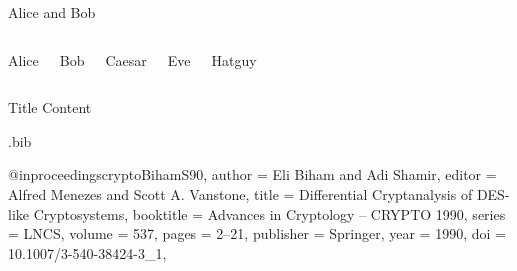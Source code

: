 \documentclass[biblatex]{cryptolecture}
\begin{document}
\begin{frame}{Alice and Bob}
  \begin{columns}[onlytextwidth,T]
      \begin{block}{Alice}\centering
        \alice[1.5cm]
      \end{block}

      \begin{block}{Bob}\centering
        \bob[1.5cm]
      \end{block}

      \begin{block}{Caesar}\centering
        \caesar[1.5cm]
      \end{block}

      \begin{block}{Eve}\centering
        \eve[1.5cm]
      \end{block}

      \begin{block}{Hatguy}\centering
        \hatguy[1.5cm]
      \end{block}
  \end{columns}
\end{frame}

\begin{frame}{Title}
  Content
\end{frame}






\begin{filecontents*}{\jobname.bib}

@inproceedings{cryptoBihamS90,
  author    = {Eli Biham and
               Adi Shamir},
  editor    = {Alfred Menezes and
               Scott A. Vanstone},
  title     = {Differential Cryptanalysis of {DES}-like Cryptosystems},
  booktitle = {Advances in Cryptology -- {CRYPTO} 1990},
  series    = {LNCS},
  volume    = {537},
  pages     = {2--21},
  publisher = {Springer},
  year      = {1990},
  doi       = {10.1007/3-540-38424-3_1},
}

\end{filecontents*}
\end{document}
